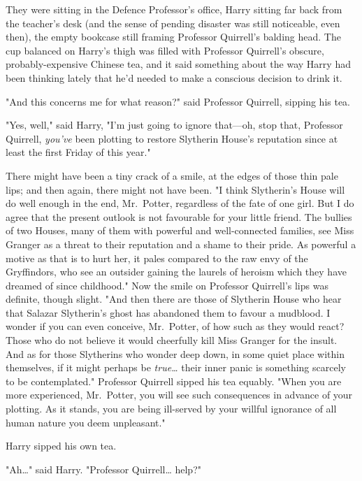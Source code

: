 They were sitting in the Defence Professor's office, Harry sitting far back
from the teacher's desk (and the sense of pending disaster was still
noticeable, even then), the empty bookcase still framing Professor Quirrell's
balding head. The cup balanced on Harry's thigh was filled with Professor
Quirrell's obscure, probably-expensive Chinese tea, and it said something about
the way Harry had been thinking lately that he'd needed to make a conscious
decision to drink it.

"And this concerns me for what reason?" said Professor Quirrell, sipping his
tea.

"Yes, well," said Harry, "I'm just going to ignore that---oh, stop that,
Professor Quirrell, \emph{you've} been plotting to restore Slytherin House's
reputation since at least the first Friday of this year."

There might have been a tiny crack of a smile, at the edges of those thin pale
lips; and then again, there might not have been. "I think Slytherin's House
will do well enough in the end, Mr.~Potter, regardless of the fate of one girl.
But I do agree that the present outlook is not favourable for your little
friend. The bullies of two Houses, many of them with powerful and
well-connected families, see Miss Granger as a threat to their reputation and a
shame to their pride. As powerful a motive as that is to hurt her, it pales
compared to the raw envy of the Gryffindors, who see an outsider gaining the
laurels of heroism which they have dreamed of since childhood." Now the smile
on Professor Quirrell's lips was definite, though slight. "And then there are
those of Slytherin House who hear that Salazar Slytherin's ghost has abandoned
them to favour a mudblood. I wonder if you can even conceive, Mr.~Potter, of how
such as they would react? Those who do not believe it would cheerfully kill
Miss Granger for the insult. And as for those Slytherins who wonder deep down,
in some quiet place within themselves, if it might perhaps be
\emph{true{\ldots}} their inner panic is something scarcely to be
contemplated." Professor Quirrell sipped his tea equably. "When you are more
experienced, Mr.~Potter, you will see such consequences in advance of your
plotting. As it stands, you are being ill-served by your willful ignorance of
all human nature you deem unpleasant."

Harry sipped his own tea.

"Ah{\ldots}" said Harry. "Professor Quirrell{\ldots} help?"

